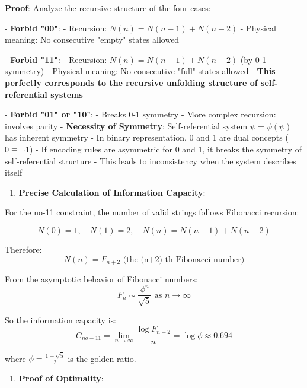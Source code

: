    \textbf{Proof}: Analyze the recursive structure of the four cases:
   
   - \textbf{Forbid "00"}:
     - Recursion: $N(n) = N(n-1) + N(n-2)$
     - Physical meaning: No consecutive "empty" states allowed
   
   - \textbf{Forbid "11"}:
     - Recursion: $N(n) = N(n-1) + N(n-2)$ (by 0-1 symmetry)
     - Physical meaning: No consecutive "full" states allowed
     - \textbf{This perfectly corresponds to the recursive unfolding structure of self-referential systems}
   
   - \textbf{Forbid "01" or "10"}:
     - Breaks 0-1 symmetry
     - More complex recursion: involves parity
     - \textbf{Necessity of Symmetry}: Self-referential system $\psi = \psi(\psi)$ has inherent symmetry
     - In binary representation, 0 and 1 are dual concepts ($0 \equiv \neg 1$)
     - If encoding rules are asymmetric for 0 and 1, it breaks the symmetry of self-referential structure
     - This leads to inconsistency when the system describes itself
   
\begin{enumerate}
\item \textbf{Precise Calculation of Information Capacity}:
\end{enumerate}
   
   For the no-11 constraint, the number of valid strings follows Fibonacci recursion:
   
\begin{equation}
N(0) = 1, \quad N(1) = 2, \quad N(n) = N(n-1) + N(n-2)
\end{equation}
   
   Therefore:
\begin{equation}
N(n) = F_{n+2} \text{ (the (n+2)-th Fibonacci number)}
\end{equation}
   
   From the asymptotic behavior of Fibonacci numbers:
\begin{equation}
F_n \sim \frac{\phi^n}{\sqrt{5}} \text{ as } n \to \infty
\end{equation}
   
   So the information capacity is:
\begin{equation}
C_{no-11} = \lim_{n \to \infty} \frac{\log F_{n+2}}{n} = \log \phi \approx 0.694
\end{equation}
   
   where $\phi = \frac{1+\sqrt{5}}{2}$ is the golden ratio.

\begin{enumerate}
\item \textbf{Proof of Optimality}:
\end{enumerate}
   
